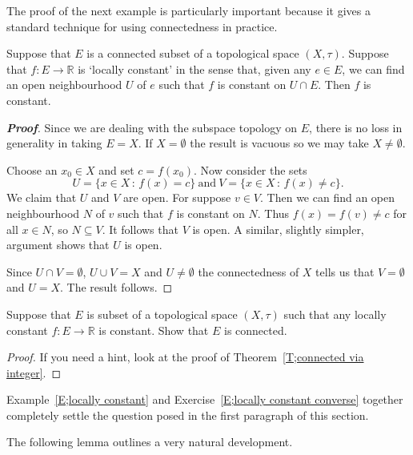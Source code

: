 The proof of the next example is particularly
important because it gives a standard technique
for using connectedness in practice.



\begin{theorem}\label{T;locally constant}
Suppose that $E$ is a connected subset of a topological
space $(X,\tau)$. Suppose that $f:E\rightarrow{\mathbb R}$
is `locally constant' in the sense that, given any
$e\in E$, we can find an open neighbourhood $U$ of $e$
such that $f$ is constant on $U\cap E$. Then $f$
is constant.
\end{theorem}
\begin{proof}[\bf Proof] Since we are dealing with the subspace
topology on $E$, there is no loss in generality
in taking $E=X$. If  $X=\emptyset$ the result is vacuous
so we may take $X\neq\emptyset$.

Choose an $x_{0}\in X$ and set $c=f(x_{0})$.
Now consider the sets
\[U=\{x\in X\,:\,f(x)=c\}\ \text{and}
\ V=\{x\in X\,:\,f(x)\neq c\}.\]
We claim that $U$ and $V$ are open.
For suppose $v\in V$.
Then we can find an open neighbourhood $N$
of $v$ such that $f$ is constant on $N$. Thus $f(x)=f(v)\neq c$
for all $x\in N$, so $N\subseteq V$. It follows that $V$
is open. A similar, slightly simpler, argument shows that $U$ is open.

Since $U\cap V=\emptyset$, $U\cup V=X$ and $U\neq \emptyset$ the connectedness of $X$ tells us that $V=\emptyset$ and $U=X$. The result follows.
\end{proof}



\begin{exercise}\label{E;locally constant converse}
Suppose that $E$ is subset of a topological
space $(X,\tau)$ such that any locally constant
$f:E\rightarrow{\mathbb R}$ is constant.
Show that $E$ is connected.
\end{exercise}
\begin{proof} If you need a hint, look at the proof of Theorem~\ref{T;connected via integer}.  
\end{proof}



Example~\ref{E;locally constant} and 
Exercise~\ref{E;locally constant converse} together
completely settle the question posed in the first paragraph
of this section.

The following lemma outlines a very natural development.

